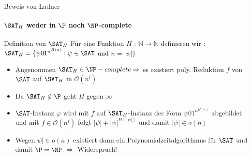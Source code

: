 \begin{frame}{Beweis von Ladner}
		\framesubtitle{${\SAT}_H$ weder in $\P$ noch $\NP$-complete}
	
		\begin{KITinfoblock}{Definition von ${\SAT}_H$}
			Für eine Funktion $H$ : $\mathbb{N} \rightarrow \mathbb{N}$ definieren wir : \newline 	
			${\SAT}_H = \lbrace \psi 01^{n^{H(n)}} : \psi \in \SAT$ und $ n = |\psi| \rbrace$
		\end{KITinfoblock}
		
		
		\bigskip
		
		\bigskip
		\pause
		\begin{itemize}[<+->]
		\item Angenommen ${\SAT}_H \in \NP-complete \Rightarrow $ es existiert poly. Reduktion $f$ von $\SAT$ auf ${\SAT}_H$ in $\mathcal{O}(n^i)$
		\item Da ${\SAT}_H \notin \P $ geht $H$ gegen $\infty$ 
		\item $\SAT$-Instanz $\varphi$ wird mit $f$ auf ${\SAT}_H$-Instanz der Form $\psi01^{n^{H(n)}}$ abgebildet und mit $ f \in \mathcal{O}(n^i)$ folgt \newline
		$|\psi| + {|\psi|}^{H(|\psi|)}$ und damit $|\psi| \in o(n)$
		\item Wegen $\psi| \in o(n)$ existiert dann ein Polynomialzeitalgorithmus für $\SAT$ und damit $\P = \NP$  $\Rightarrow$ Widerspruch! 
		
		\end{itemize}
\end{frame}